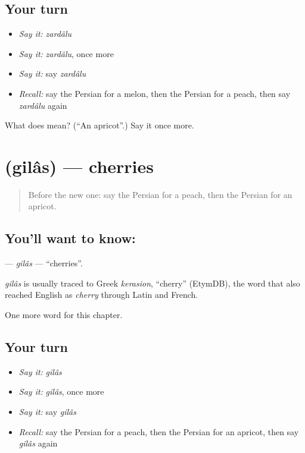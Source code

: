 \subsection*{Your turn}
\begin{itemize}
\raggedright
  \item \emph{Say it:} \emph{zardâlu}
  \item \emph{Say it:} \emph{zardâlu}, once more
  \item \emph{Say it:} say \emph{zardâlu}
  \item \emph{Recall:} say the Persian for a melon, then the Persian for a peach, then say \emph{zardâlu} again
\end{itemize}

\begin{tcolorbox}[breakable,colback=teal!4,colframe=teal!35!black,title={Before you move on}]
What does  mean? (\textquotedblleft{}An apricot\textquotedblright{}.) Say it once more.
\end{tcolorbox}
\section[\texorpdfstring{\fa{گیلاس} (gilâs)}{گیلاس (gilâs)}]{ (gilâs) — cherries}

\label{lesson:FA-C100-gilas}



\begin{quote}
Before the new one: say the Persian for a peach, then the Persian for an apricot.
\end{quote}

\subsection*{You'll want to know: }
\textbf{} — \emph{gilâs} — \textquotedblleft{}cherries\textquotedblright{}.

\begin{cousinweb}
\emph{gilâs} is usually traced to Greek \emph{kerasion}, \textquotedblleft{}cherry\textquotedblright{} (EtymDB), the word that also reached English as \emph{cherry} through Latin and French.
\end{cousinweb}

\begin{grammarlens}[title={What you've built}]
One more word for this chapter.
\end{grammarlens}

\subsection*{Your turn}
\begin{itemize}
\raggedright
  \item \emph{Say it:} \emph{gilâs}
  \item \emph{Say it:} \emph{gilâs}, once more
  \item \emph{Say it:} say \emph{gilâs}
  \item \emph{Recall:} say the Persian for a peach, then the Persian for an apricot, then say \emph{gilâs} again
\end{itemize}

